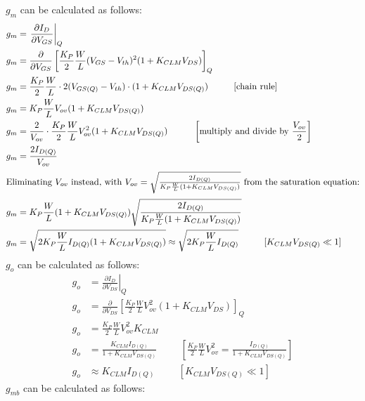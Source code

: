 \begin{itemize}
\begin{itemize}
        \(g_m\) can be calculated as follows:
        \begin{align*}
          g_m &= \left.\frac{\partial I_D}{\partial V_{GS}}\right|_{Q} \\
          g_m &= \frac{\partial}{\partial V_{GS}} \left[ \frac{K_P}{2} \frac{W}{L} (V_{GS} - V_{th})^2 (1 + K_{CLM} V_{DS}) \right]_{Q} \\
          g_m &= \frac{K_P}{2} \frac{W}{L} \cdot 2 (V_{GS(Q)} - V_{th}) \cdot (1 + K_{CLM} V_{DS(Q)}) \hspace{1cm} [\text{chain rule}] \\
          g_m &= K_P \frac{W}{L} V_{ov} (1 + K_{CLM} V_{DS(Q)}) \\
          g_m &= \frac{2}{V_{ov}} \cdot \frac{K_P}{2} \frac{W}{L} V_{ov}^2 (1 + K_{CLM} V_{DS(Q)}) \hspace{1cm} \left[\text{multiply and divide by } \frac{V_{ov}}{2}\right] \\
          g_m &= \frac{2 I_{D(Q)}}{V_{ov}} \\
          \intertext{Eliminating \(V_{ov}\) instead, with \(V_{ov} = \sqrt{\frac{2 I_{D(Q)}}{K_P \frac{W}{L} (1 + K_{CLM} V_{DS(Q)})}}\) from the saturation equation:}
          g_m &= K_P \frac{W}{L} (1 + K_{CLM} V_{DS(Q)}) \sqrt{\frac{2 I_{D(Q)}}{K_P \frac{W}{L} (1 + K_{CLM} V_{DS(Q)})}} \\
          g_m &= \sqrt{2 K_P \frac{W}{L} I_{D(Q)} (1 + K_{CLM} V_{DS(Q)})} \approx \sqrt{2 K_P \frac{W}{L} I_{D(Q)}} \hspace{1cm} [K_{CLM} V_{DS(Q)} \ll 1]
        \end{align*}
        \(g_o\) can be calculated as follows:
        \begin{align*}
          g_o &= \left.\frac{\partial I_D}{\partial V_{DS}}\right|_{Q} \\
          g_o &= \frac{\partial}{\partial V_{DS}} \left[ \frac{K_P}{2} \frac{W}{L} V_{ov}^2 (1 + K_{CLM} V_{DS}) \right]_{Q} \\
          g_o &= \frac{K_P}{2} \frac{W}{L} V_{ov}^2 K_{CLM} \\
          g_o &= \frac{K_{CLM} I_{D(Q)}}{1 + K_{CLM} V_{DS(Q)}} \hspace{1cm} \left[\frac{K_P}{2} \frac{W}{L} V_{ov}^2 = \frac{I_{D(Q)}}{1 + K_{CLM} V_{DS(Q)}}\right] \\
          g_o &\approx K_{CLM} I_{D(Q)} \hspace{1cm} [K_{CLM} V_{DS(Q)} \ll 1]
        \end{align*}
        \(g_{mb}\) can be calculated as follows:

\end{itemize}
\end{itemize}
